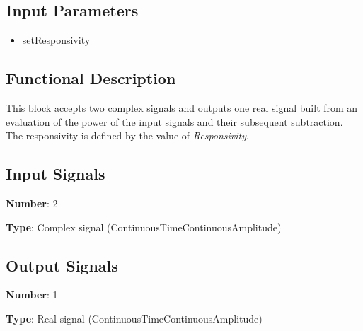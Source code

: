\documentclass[../../sdf/tex/BPSK_system.tex]{subfiles}
\date{}
\begin{document}
\onlyinsubfile{\maketitle}

\subsection*{Input Parameters}

\begin{multicols}{2}
	\begin{itemize}
		\item setResponsivity
	\end{itemize}
\end{multicols}

\subsection*{Functional Description}

This block accepts two complex signals and outputs one real signal built from an evaluation of the power of the input signals and their subsequent subtraction. The responsivity is defined by the value of \textit{Responsivity}.


\subsection*{Input Signals}

\textbf{Number}: 2

\textbf{Type}: Complex signal (ContinuousTimeContinuousAmplitude)

\subsection*{Output Signals}

\textbf{Number}: 1

\textbf{Type}: Real signal (ContinuousTimeContinuousAmplitude)
\end{document}
